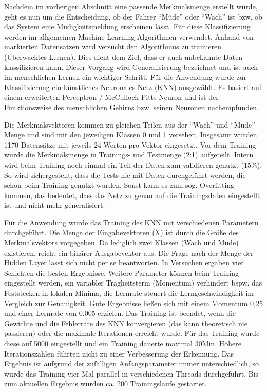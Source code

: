 \label{sec:classification}
Nachdem im vorherigen Abschnitt eine passende Merkmalsmenge erstellt wurde, geht es nun um die Entscheidung, ob der Fahrer "`Müde"' oder "`Wach"' ist bzw. ob das System eine Müdigkeitsmeldung erscheinen lässt. Für diese Klassifizierung werden im allgemeinen Machine-Learning-Algorithmen verwendet. Anhand von markierten Datensätzen wird versucht den Algorithmus zu trainieren (Überwachtes Lernen). Dies dient dem Ziel, dass er auch unbekannte Daten klassifizieren kann. Dieser Vorgang wird Generalisierung bezeichnet und ist auch im menschlichen Lernen ein wichtiger Schritt. Für die Anwendung wurde zur Klassifizierung ein künstliches Neuronales Netz (KNN) ausgewählt. Es basiert auf einem erweiterten Perceptron / McCulloch-Pitts-Neuron \cite{ann} und ist der Funktionsweise des menschlichen Gehirns bzw. seinen Neuronen nachempfunden\cite{marsland_opac-b1129336}. \ann

Die Merkmalsvektoren kommen zu gleichen Teilen aus der "`Wach"' und "`Müde"'-Menge und sind mit den jeweiligen Klassen 0 und 1 versehen. Insgesamt wurden 1170 Datensätze mit jeweils 24 Werten pro Vektor eingesetzt. Vor dem Training wurde die Merkmalsmenge in Trainings- und Testmenge (2:1) aufgeteilt. Intern wird beim Training noch einmal ein Teil der Daten zum validieren genutzt (15\%). So wird sichergestellt, dass die Tests nie mit Daten durchgeführt werden, die schon beim Training genutzt wurden. Sonst kann es zum sog. Overfitting kommen, das bedeutet, dass das Netz zu genau auf die Trainingsdaten eingestellt ist und nicht mehr generalisiert.

Für die Anwendung wurde das Training des KNN mit verschiedenen Parametern durchgeführt. Die Menge der Eingabevektoren (X) ist durch die Größe des Merkmalsvektors vorgegeben. Da lediglich zwei Klassen (Wach und Müde) existieren, reicht ein binärer Ausgabevektor aus. Die Frage nach der Menge der Hidden Layer lässt sich nicht per se beantworten. In Versuchen ergaben vier Schichten die besten Ergebnisse. Weitere Parameter können beim Training eingestellt werden, ein variabler Trägheitsterm (Momentum) verhindert bspw. das Feststecken in lokalen Minima, die Lernrate steuert die Lerngeschwindigkeit im Vergleich zur Genauigkeit. Gute Ergebnisse ließen sich mit einem Momentum 0,25 und einer Lernrate von 0.005 erzielen. Das Training ist beendet, wenn die Gewichte und die Fehlerrate des KNN konvergieren (das kann theoretisch nie passieren) oder die maximale Iterationen erreicht wurde. Für das Training wurde diese auf 5000 eingestellt und ein Training dauerte maximal 30Min. Höhere Iterationszahlen führten nicht zu einer Verbesserung der Erkennung. Das Ergebnis ist aufgrund der zufälligen Anfangsparameter immer unterschiedlich, so wurde das Training vier Mal parallel in verschiedenen Threads durchgeführt. Bis zum aktuellen Ergebnis wurden ca. 200 Trainingsläufe gestartet.

